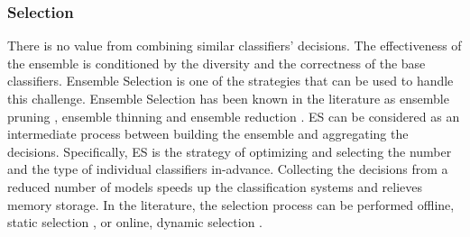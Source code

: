\subsubsection{Selection}
There is no value from combining similar classifiers' decisions. The effectiveness of the ensemble is conditioned by the diversity and the correctness of the base classifiers. Ensemble Selection is one of the strategies that can be used to handle this challenge. Ensemble Selection has been known in the literature as ensemble pruning \cite{lu2010,zhang2006,ykhlef2017}, ensemble thinning \cite{banfield2005} and ensemble reduction \cite{diao2013,zhang2018}. ES can be considered as an intermediate process between building the ensemble and aggregating the decisions. Specifically, ES is the strategy of optimizing and selecting the number and the type of individual classifiers in-advance. Collecting the decisions from a reduced number of models speeds up the classification systems and relieves memory storage. In the literature, the selection process can be performed offline, static selection \cite{tsoumakas2009}, or online, dynamic selection \cite{cruz2018}.
 
